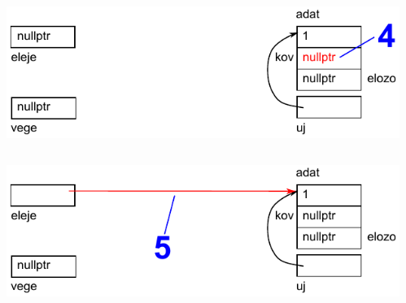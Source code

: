 \begin{frame}
  \begin{columns}[c]
      \scriptsize
      \begin{exampleblock}{}
        \vspace{-.2cm}
        
        \vspace{-.2cm}
      \end{exampleblock}
      \includegraphics[width=\textwidth]{sor/sor05.pdf}
  \end{columns}
\end{frame}

\begin{frame}
  \begin{columns}[c]
      \scriptsize
      \begin{exampleblock}{}
        \vspace{-.2cm}
        
        \vspace{-.2cm}
      \end{exampleblock}
      \includegraphics[width=\textwidth]{sor/sor06.pdf}
  \end{columns}
\end{frame}

